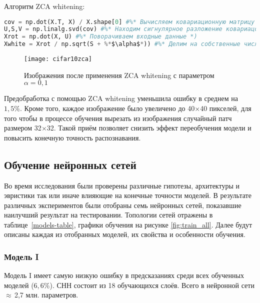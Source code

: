 Алгоритм ZCA whitening:
\begin{lstlisting}[language=Python, frame=TB]
cov = np.dot(X.T, X) / X.shape[0] #%* Вычисляем ковариационную матрицу *)
U,S,V = np.linalg.svd(cov) #%* Находим сигнулярное разложение ковариацонной матрицы *)
Xrot = np.dot(X, U) #%* Поворачиваем входные данные *)
Xwhite = Xrot / np.sqrt(S + %*$\alpha$*)) #%* Делим на собственные числа *)
\end{lstlisting}
\vspace*{-1.4cm}
\begin{figure}[h]
    \centering
    \texttt{[image: cifar10zca]}
    \caption{Изображения после применения ZCA whitening с параметром $\alpha=0,1$}
\end{figure}
Предобработка с помощью ZCA whitening уменьшила ошибку в среднем на $1,5\%$. Кроме того, каждое изображение было
увеличено до 40$\times$40 пикселей, для того чтобы в процессе обучения вырезать из 
изображения случайный патч размером 32$\times$32. Такой приём позволяет снизить эффект переобучения модели и повысить конечную 
точность распознавания.

\subsection{Обучение нейронных сетей}
Во время исследования были проверены различные гипотезы, архитектуры и эвристики так или иначе влияющие на конечные точности 
моделей. В результате различных экспериментов были отобраны семь нейронных сетей, показавшие наилучший результат на тестировании.
Топологии сетей отражены в таблице~\ref{models-table}, графики обучения на рисунке \ref{fig:train_all}.
Далее будут описаны каждая из отобранных моделей, их свойства и особенности обучения.

\subsubsection{Модель I}
Модель I имеет самую низкую ошибку в предсказаниях среди всех обученных моделей ($6,6$\%). СНН состоит из 18 обучающихся слоёв.
Всего в нейронной сети $\approx$\,2,7 млн. параметров.

